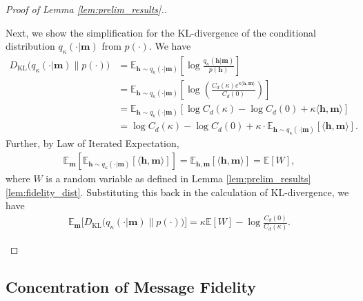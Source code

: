 \documentclass[12pt]{article}
\newcommand{\EE}{\mathbb E}
\theoremstyle{definition}
\theoremstyle{remark}
\begin{document}
\begin{proof}[Proof of Lemma \ref{lem:prelim_results}.]
\begin{itemize}
    Next, we show the simplification for the KL-divergence of the conditional distribution $q_{\kappa}(\cdot | \mathbf{m})$ from $p(\cdot)$. We have
    \begin{align*}
    D_{\mathrm{KL}}\big(q_{\kappa}(\cdot | \mathbf{m}) \| p(\cdot)\big) &= \EE_{\mathbf{h} \sim q_{\kappa}(\cdot | \mathbf{m})} \left[\log \frac{q_{\kappa}(\mathbf{h} | \mathbf{m})}{p(\mathbf{h})}\right] \\
    &= \EE_{\mathbf{h} \sim q_{\kappa}(\cdot | \mathbf{m})} \left[\log \left(\frac{C_d(\kappa) e^{\kappa \langle \mathbf{h}, \mathbf{m} \rangle}}{C_d(0)}\right)\right]\\
    &= \EE_{\mathbf{h} \sim q_{\kappa}(\cdot | \mathbf{m})} \left[\log C_d(\kappa) - \log C_d(0) + \kappa \langle \mathbf{h}, \mathbf{m} \rangle\right] \\
    &= \log C_d(\kappa) - \log C_d(0) + \kappa \cdot \EE_{\mathbf{h} \sim q_{\kappa}(\cdot | \mathbf{m})} [\langle \mathbf{h}, \mathbf{m} \rangle].
    \end{align*}
    Further, by Law of Iterated Expectation,
    \begin{align*}
        \EE_{\mathbf{m}} \left[ \EE_{\mathbf{h} \sim q_{\kappa}(\cdot | \mathbf{m})} [\langle \mathbf{h}, \mathbf{m} \rangle] \right] = \EE_{\mathbf{h},\mathbf{m}}[\langle \mathbf{h}, \mathbf{m} \rangle] = \EE[W],
    \end{align*}
    where $W$ is a random variable as defined in Lemma \ref{lem:prelim_results}\ref{lem:fidelity_dist}. Substituting this back in the calculation of KL-divergence, we have
    \begin{align*}
        \EE_{\mathbf{m}} \big[D_{\mathrm{KL}}\big(q_{\kappa} (\cdot | \mathbf{m})\| p(\cdot)\big) \big] = \kappa \EE[W] - \log \frac{C_d(0)}{C_d(\kappa)}.
    \end{align*}
\end{itemize}
\end{proof}

\subsection{Concentration of Message Fidelity}
\end{document}
